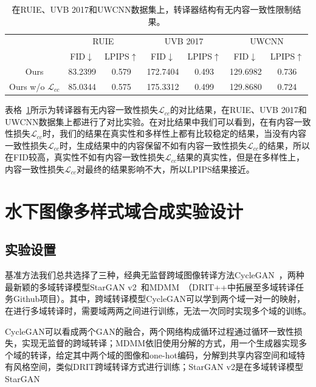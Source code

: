 \begin{table}[htbp]
  \centering
  \caption{在RUIE、UVB 2017和UWCNN数据集上，转译器结构有无内容一致性限制结果。}
    \begin{tabular}{c|c|c|c|c|c|c}
    \hline
    \multirow{2}[3]{*}{} & \multicolumn{2}{c|}{RUIE} & \multicolumn{2}{c|}{UVB 2017} & \multicolumn{2}{c}{UWCNN} \\
\cmidrule{2-7}          & \multicolumn{1}{c|}{FID$\downarrow$ } & \multicolumn{1}{c|}{LPIPS$\uparrow$} & \multicolumn{1}{c|}{FID$\downarrow$ } & \multicolumn{1}{c|}{LPIPS$\uparrow$} & \multicolumn{1}{c|}{FID$\downarrow$ } & LPIPS$\uparrow$ \\
    \midrule
    Ours  & 83.2399 & 0.579 & 172.7404 & 0.493 & 129.6982 & 0.736 \\
    Ours w/o $\mathcal{L}_{cc}$ & 85.0344 & 0.575 & 175.3312 & 0.499 & 129.8680 & 0.724 \\
    \hline
    \end{tabular}%
  \label{tab:ablation_modal_lcc}%
\end{table}%

表格~\ref{tab:ablation_modal_lcc}所示为转译器有无内容一致性损失$\mathcal{L}_{cc}$的对比结果，在RUIE、UVB 2017和UWCNN数据集上都进行了对比实验。在对比结果中我们可以看到，在有内容一致性损失$\mathcal{L}_{cc}$时，我们的结果在真实性和多样性上都有比较稳定的结果，当没有内容一致性损失$\mathcal{L}_{cc}$时，生成结果中的内容保留不如有内容一致性损失$\mathcal{L}_{cc}$的结果，所以在FID较高，真实性不如有内容一致性损失$\mathcal{L}_{cc}$结果的真实性，但是在多样性上，内容一致性损失$\mathcal{L}_{cc}$对最终的结果影响不大，所以LPIPS结果接近。

\section{水下图像多样式域合成实验设计}
\subsection{实验设置}
基准方法我们总共选择了三种，经典无监督跨域图像转译方法CycleGAN~\cite{zhu2017unpaired}，两种最新颖的多域转译模型StarGAN v2~\cite{choi2020stargan}和MDMM~\cite{lee2020drit++}（DRIT++中拓展至多域转译任务Github项目）。其中，跨域转译模型CycleGAN可以学到两个域一对一的映射，在进行多域转译时，需要域两两之间进行训练，无法一次同时实现多个域的训练。

CycleGAN可以看成两个GAN的融合，两个网络构成循环过程通过循环一致性损失，实现无监督的跨域转译；MDMM依旧使用分解的方式，用一个生成器实现多个域的转译，给定其中两个域的图像和one-hot编码，分解到共享内容空间和域特有风格空间，类似DRIT跨域转译方式进行训练；StarGAN v2是在多域转译模型StarGAN

